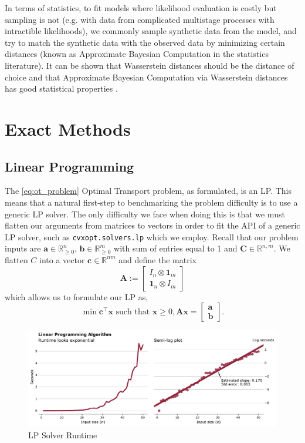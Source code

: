 \documentclass{article}
\theoremstyle{definition}
\theoremstyle{remark}
\begin{document}
In terms of statistics, to fit models where likelihood evaluation is costly
 but
 sampling is not (e.g. with data from complicated multistage processes with
 intractible likelihoods), we commonly sample synthetic data from the model, and
 try to match the synthetic data with the observed data by minimizing certain
 distances (known as Approximate Bayesian Computation in the statistics
 literature).
It can be shown that Wasserstein distances should be the distance of choice and
 that Approximate Bayesian Computation via Wasserstein distances has good
 statistical properties \cite{bernton2017inference}.


\section{Exact Methods}
\label{sec:exact}

\subsection{Linear Programming} %
\label{sub:linear_programming}

The \ref{eq:ot_problem} Optimal Transport problem, as formulated, is an LP. This
means that a natural first-step to benchmarking the problem difficulty is to use
a generic LP solver. The only difficulty we face when doing this is that we must
flatten our arguments from matrices to vectors in order to fit the API of a
generic LP solver, such as \texttt{cvxopt.solvers.lp} which we employ. Recall
that our problem inputs are $\mathbf{a} \in \mathbb{R}^n_{\ge 0}$, $\mathbf{b}
\in \mathbb{R}^m_{\ge 0}$ with sum of entries equal to 1 and $\mathbf{C} \in
\mathbb{R}^{n,m}$. We flatten $C$ into a vector $\mathbf{c} \in \mathbb{R}^{nm}$
and define the matrix
\[ \mathbf{A} := \begin{bmatrix} I_n \otimes \mathbf{1}_m \\ \mathbf{1}_n
\otimes I_m \end{bmatrix} \]
which allows us to formulate our LP as,
\[ \min \mathbf{c}^\top \mathbf{x} \text{ such that } \mathbf{x} \ge 0,
\mathbf{A} \mathbf{x} = \begin{bmatrix} \mathbf{a} \\ \mathbf{b}
\end{bmatrix}.\]

\begin{figure}[b]
\includegraphics[width=\textwidth]{../../code/lpruntime}
\caption{LP Solver Runtime}
\label{fig:lpruntime}
\end{figure}
\end{document}
